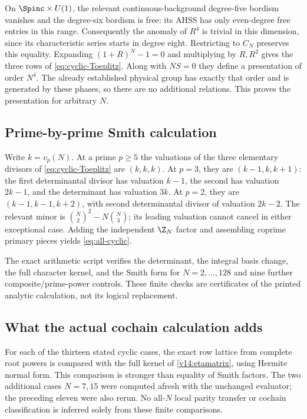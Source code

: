 On $\Spinc\times U(1)$, the relevant continuous-background degree-five bordism vanishes and the degree-six bordism is free: its AHSS has only even-degree free entries in this range. Consequently the anomaly of $R^4$ is trivial in this dimension, since its characteristic series starts in degree eight. Restricting to $C_N$ preserves this equality. Expanding $(1+R)^N-1=0$ and multiplying by $R,R^2$ gives the three rows of \eqref{eq:cyclic-Toeplitz}. Along with $NS=0$ they define a presentation of order $N^4$. The already established physical group has exactly that order and is generated by these phases, so there are no additional relations. This proves the presentation for arbitrary $N$.

\subsection{Prime-by-prime Smith calculation}
Write $k=v_p(N)$. At a prime $p\ge5$ the valuations of the three elementary divisors of \eqref{eq:cyclic-Toeplitz} are $(k,k,k)$. At $p=3$, they are $(k-1,k,k+1)$: the first determinantal divisor has valuation $k-1$, the second has valuation $2k-1$, and the determinant has valuation $3k$. At $p=2$, they are $(k-1,k-1,k+2)$, with second determinantal divisor of valuation $2k-2$. The relevant minor is $\binom N2^2-N\binom N3$; its leading valuation cannot cancel in either exceptional case. Adding the independent $\Z_N$ factor and assembling coprime primary pieces yields \eqref{eq:all-cyclic}.

The exact arithmetic script verifies the determinant, the integral basis change, the full character kernel, and the Smith form for $N=2,\ldots,128$ and nine further composite/prime-power controls. These finite checks are certificates of the printed analytic calculation, not its logical replacement.

\subsection{What the actual cochain calculation adds}
For each of the thirteen stated cyclic cases, the exact row lattice from complete root powers is compared with the full kernel of \eqref{v14:etamatrix}, using Hermite normal form. This comparison is stronger than equality of Smith factors. The two additional cases $N=7,15$ were computed afresh with the unchanged evaluator; the preceding eleven were also rerun. No all-$N$ local parity transfer or cochain classification is inferred solely from these finite comparisons.
